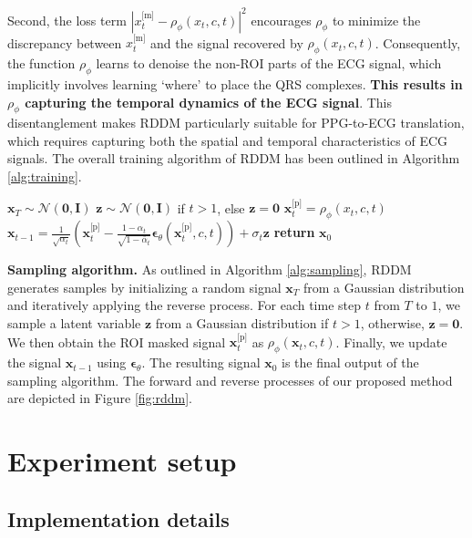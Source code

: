 \documentclass[letterpaper]{article} %
\newcommand{\bI}{\mathbf{I}}
\newcommand{\bzero}{\mathbf{0}}
\newcommand{\bz}{\mathbf{z}}
\newcommand{\bepsilon}{{\boldsymbol{\epsilon}}}
\newcommand{\x}{{\boldsymbol x}}
\begin{document}
Second, the loss term $|x_t^{\text{[m]}} - \rho_{\phi}(x_t, c, t)|^2$ encourages $\rho_{\phi}$ to minimize the discrepancy between $x_t^{\text{[m]}}$ and the signal recovered by $\rho_{\phi}(x_t, c, t)$.
Consequently, the function $\rho_{\phi}$ learns to denoise the non-ROI parts of the ECG signal, which implicitly involves learning `where' to place the QRS complexes.
\textbf{This results in $\rho_{\phi}$ capturing the temporal dynamics of the ECG signal}. This disentanglement makes RDDM particularly suitable for PPG-to-ECG translation, which requires capturing both the spatial and temporal characteristics of ECG signals. The overall training algorithm of RDDM has been outlined in Algorithm \ref{alg:training}.

\begin{algorithm}[t]
  \caption{RDDM Sampling} \label{alg:sampling}
  \small
  \begin{algorithmic}[1]
    \State $\x_T \sim \mathcal{N}(\bzero, \bI)$
      \State $\bz \sim \mathcal{N}(\bzero, \bI)$ if $t > 1$, else $\bz = \bzero$
      \State $\x_t^{\text{[p]}} = \rho_{\phi}(x_t, c, t)$
      \State $\x_{t-1}\!=\!\frac{1}{\sqrt{\alpha_t}}\left( \x_t^{\text{[p]}} - \frac{1-\alpha_t}{\sqrt{1-\bar\alpha_t}} \bepsilon_\theta(\x_t^{\text{[p]}}, c, t) \right) + \sigma_t \bz$
    \EndFor
    \State \textbf{return} $\x_0$
  \end{algorithmic}
\end{algorithm}

\noindent\textbf{Sampling algorithm.} As outlined in Algorithm \ref{alg:sampling}, RDDM generates samples by initializing a random signal $\x_T$ from a Gaussian distribution and iteratively applying the reverse process. For each time step $t$ from $T$ to $1$, we sample a latent variable $\bz$ from a Gaussian distribution if $t > 1$, otherwise, $\bz = \bzero$. We then obtain the ROI masked signal $\x_t^{\text{[p]}}$ as $\rho_{\phi}(\x_t, c, t)$. Finally, we update the signal $\x_{t-1}$ using $\boldsymbol{\epsilon}_\theta$. The resulting signal $\x_0$ is the final output of the sampling algorithm. The forward and reverse processes of our proposed method are depicted in Figure \ref{fig:rddm}.

\section{Experiment setup}

\subsection{Implementation details}
\end{document}
